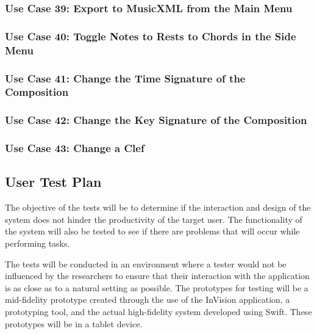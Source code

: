 \subsubsection{Use Case 39: Export to MusicXML from the Main Menu}


\subsubsection{Use Case 40: Toggle Notes to Rests to Chords in the Side Menu}


\subsubsection{Use Case 41: Change the Time Signature of the Composition}


\subsubsection{Use Case 42: Change the Key Signature of the Composition}


\subsubsection{Use Case 43: Change a Clef}


\subsection{User Test Plan}

The objective of the tests will be to determine if the interaction and design of the system does not hinder the productivity of the target user. The functionality of the system will also be tested to see if there are problems that will occur while performing tasks.

The tests will be conducted in an environment where a tester would not be influenced by the researchers to ensure that their interaction with the application is as close as to a natural setting as possible. The prototypes for testing will be a mid-fidelity prototype created through the use of the InVision application, a prototyping tool, and the actual high-fidelity system developed using Swift. These prototypes will be in a tablet device. 

